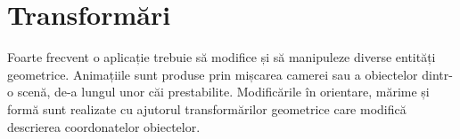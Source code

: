 \chapter{Transformări}
Foarte frecvent o aplicație trebuie să modifice și să manipuleze
diverse entități geometrice. Animațiile sunt produse prin mișcarea camerei sau
a obiectelor dintr-o scenă, de-a lungul unor căi prestabilite. Modificările în
orientare, mărime și formă sunt realizate cu ajutorul transformărilor geometrice
care modifică descrierea coordonatelor obiectelor.